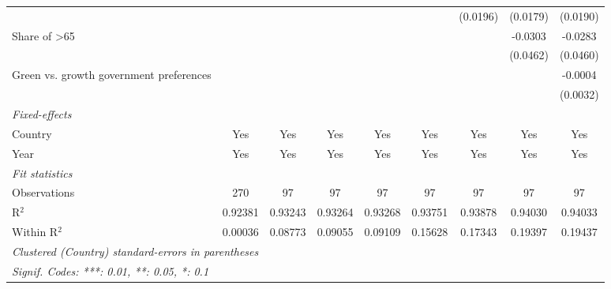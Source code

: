\begin{table}[htbp]
\begin{tabular}{lcccccccc}
                                                            &          &          &          &          &          & (0.0196) & (0.0179) & (0.0190)\\   
      Share of >65                                          &          &          &          &          &          &          & -0.0303  & -0.0283\\   
                                                            &          &          &          &          &          &          & (0.0462) & (0.0460)\\   
      Green vs. growth government preferences               &          &          &          &          &          &          &          & -0.0004\\   
                                                            &          &          &          &          &          &          &          & (0.0032)\\   
      \midrule
      \emph{Fixed-effects}\\
      Country                                               & Yes      & Yes      & Yes      & Yes      & Yes      & Yes      & Yes      & Yes\\  
      Year                                                  & Yes      & Yes      & Yes      & Yes      & Yes      & Yes      & Yes      & Yes\\  
      \midrule
      \emph{Fit statistics}\\
      Observations                                          & 270      & 97       & 97       & 97       & 97       & 97       & 97       & 97\\  
      R$^2$                                                 & 0.92381  & 0.93243  & 0.93264  & 0.93268  & 0.93751  & 0.93878  & 0.94030  & 0.94033\\  
      Within R$^2$                                          & 0.00036  & 0.08773  & 0.09055  & 0.09109  & 0.15628  & 0.17343  & 0.19397  & 0.19437\\  
      \midrule \midrule
      \multicolumn{9}{l}{\emph{Clustered (Country) standard-errors in parentheses}}\\
      \multicolumn{9}{l}{\emph{Signif. Codes: ***: 0.01, **: 0.05, *: 0.1}}\\
   \end{tabular}
\end{table}


